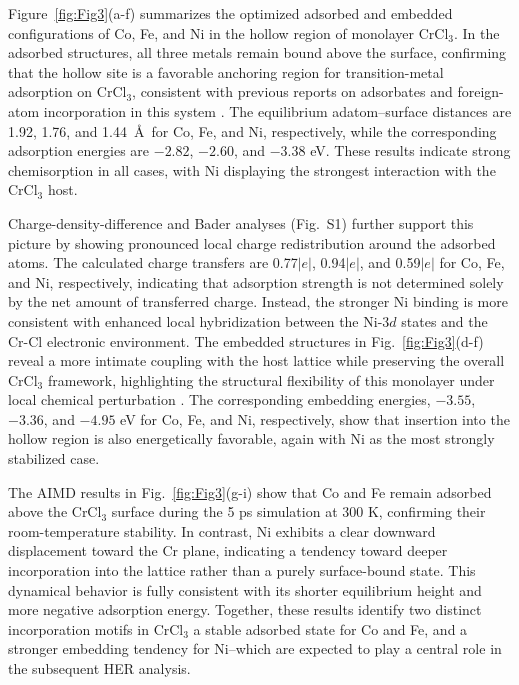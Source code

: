 \documentclass[journal=jacsat,manuscript=article]{achemso}
\begin{document}
Figure~\ref{fig:Fig3}(a-f) summarizes the optimized adsorbed and embedded configurations of Co, Fe, and Ni in the hollow region of monolayer CrCl$_3$. In the adsorbed structures, all three metals remain bound above the surface, confirming that the hollow site is a favorable anchoring region for transition-metal adsorption on CrCl$_3$, consistent with previous reports on adsorbates and foreign-atom incorporation in this system \cite{Luo2020,Luo2020a,Mastrippolito2021,Mastrippolito2022}. The equilibrium adatom--surface distances are 1.92, 1.76, and 1.44~\AA\ for Co, Fe, and Ni, respectively, while the corresponding adsorption energies are $-2.82$, $-2.60$, and $-3.38$ eV. These results indicate strong chemisorption in all cases, with Ni displaying the strongest interaction with the CrCl$_3$ host.

Charge-density-difference and Bader analyses (Fig.~S1) further support this picture by showing pronounced local charge redistribution around the adsorbed atoms. The calculated charge transfers are 0.77$|e|$, 0.94$|e|$, and 0.59$|e|$ for Co, Fe, and Ni, respectively, indicating that adsorption strength is not determined solely by the net amount of transferred charge. Instead, the stronger Ni binding is more consistent with enhanced local hybridization between the Ni-$3d$ states and the Cr-Cl electronic environment. The embedded structures in Fig.~\ref{fig:Fig3}(d-f) reveal a more intimate coupling with the host lattice while preserving the overall CrCl$_3$ framework, highlighting the structural flexibility of this monolayer under local chemical perturbation \cite{Wang2019,Gao2018,Mastrippolito2021,Mastrippolito2022}. The corresponding embedding energies, $-3.55$, $-3.36$, and $-4.95$ eV for Co, Fe, and Ni, respectively, show that insertion into the hollow region is also energetically favorable, again with Ni as the most strongly stabilized case.

The AIMD results in Fig.~\ref{fig:Fig3}(g-i) show that Co and Fe remain adsorbed above the CrCl$_3$ surface during the 5 ps simulation at 300 K, confirming their room-temperature stability. In contrast, Ni exhibits a clear downward displacement toward the Cr plane, indicating a tendency toward deeper incorporation into the lattice rather than a purely surface-bound state. This dynamical behavior is fully consistent with its shorter equilibrium height and more negative adsorption energy. Together, these results identify two distinct incorporation motifs in CrCl$_3$ a stable adsorbed state for Co and Fe, and a stronger embedding tendency for Ni--which are expected to play a central role in the subsequent HER analysis.
\end{document}
